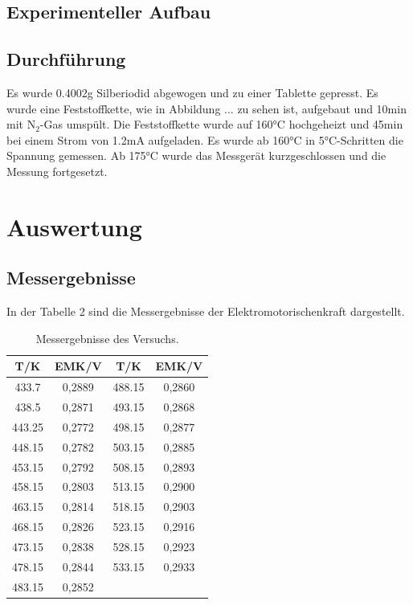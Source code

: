 \documentclass[12pt,a4paper,titlepage,headinclude,bibtotoc]{scrartcl}
\begin{document}
\subsection{Experimenteller Aufbau}

\subsection{Durchführung}
Es wurde 0.4002\;g Silberiodid abgewogen und zu einer Tablette gepresst. Es wurde eine Feststoffkette, wie in Abbildung ... zu sehen ist, aufgebaut und 10\;min mit $\text{N}_2$-Gas umspült. Die Feststoffkette wurde auf 160\;°C hochgeheizt und 45\;min bei einem Strom von 1.2\;mA aufgeladen. Es wurde ab 160\;°C in 5\;°C-Schritten die Spannung gemessen. Ab 175\;°C wurde das Messgerät kurzgeschlossen und die Messung fortgesetzt. 
\section{Auswertung}
\subsection{Messergebnisse}
In der Tabelle 2 sind die Messergebnisse der Elektromotorischenkraft dargestellt.
\begin{table}[h!]
\centering
\caption{Messergebnisse des Versuchs.}
\begin{tabular}{c|c||c|c}
T/\;K & EMK/\;V &T/\;K & EMK/\;V\\ 
\hline
433.7 & 0,2889 &   488.15 &0,2860\\ 
438.5 & 0,2871 & 493.15&0,2868 \\
443.25 & 0,2772 &  498.15&0,2877\\
448.15 & 0,2782 & 503.15& 0,2885\\
453.15 &0,2792 & 508.15 &0,2893\\
458.15 & 0,2803 & 513.15 &0,2900\\
463.15 &0,2814 & 518.15 &0,2903\\
468.15 &0,2826 & 523.15&0,2916\\
473.15 &0,2838 & 528.15 & 0,2923\\
478.15 & 0,2844 & 533.15& 0,2933\\
483.15 & 0,2852 &&\\
\end{tabular} 
\end{table}
\FloatBarrier
\end{document}

